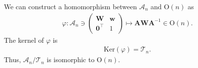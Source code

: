 We can construct a homomorphism between $\mathcal{A}_{n}$ and $\mathrm{O}(n)$ as
\begin{align*}
  \varphi: \mathcal{A}_{n} \ni \begin{pmatrix} \bm{W} & \bm{w} \\ \bm{0}^{\top} & 1 \end{pmatrix}
    \mapsto \bm{A} \bm{W} \bm{A}^{-1} \in \mathrm{O}(n).
\end{align*}
The kernel of $\varphi$ is
\begin{align*}
  \mathrm{Ker}(\varphi) = \mathcal{T}_{n}.
\end{align*}
Thus, $\mathcal{A}_{n} / \mathcal{T}_{n}$ is isomorphic to $\mathrm{O}(n)$.
